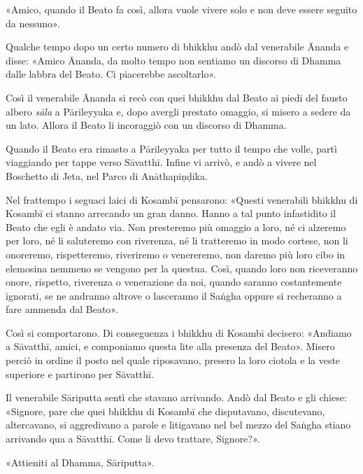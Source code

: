 «Amico, quando il Beato fa così, allora vuole vivere solo e non deve
essere seguito da nessuno».


Qualche tempo dopo un certo numero di bhikkhu andò dal venerabile Ānanda
e disse: «Amico Ānanda, da molto tempo non sentiamo un discorso di
Dhamma dalle labbra del Beato. Ci piacerebbe ascoltarlo».


Così il venerabile Ānanda si recò con quei bhikkhu dal Beato ai piedi
del fausto albero \emph{sāla} a Pārileyyaka e, dopo avergli prestato omaggio,
si misero a sedere da un lato. Allora il Beato li incoraggiò con un
discorso di Dhamma.




 Quando il Beato era rimasto a Pārileyyaka per tutto il
tempo che volle, partì viaggiando per tappe verso Sāvatthī. Infine vi
arrivò, e andò a vivere nel Boschetto di Jeta, nel Parco di
Anāthapiṇḍika.


Nel frattempo i seguaci laici di Kosambī pensarono: «Questi venerabili
bhikkhu di Kosambī ci stanno arrecando un gran danno. Hanno a tal punto
infastidito il Beato che egli è andato via. Non presteremo più omaggio a
loro, né ci alzeremo per loro, né li saluteremo con riverenza, né li
tratteremo in modo cortese, non li onoreremo, rispetteremo, riveriremo o
venereremo, non daremo più loro cibo in elemosina nemmeno se vengono per
la questua. Così, quando loro non riceveranno onore, rispetto, riverenza
o venerazione da noi, quando saranno costantemente ignorati, se ne
andranno altrove o lasceranno il Saṅgha oppure si recheranno a fare
ammenda dal Beato».


Così si comportarono. Di conseguenza i bhikkhu di Kosambī decisero:
«Andiamo a Sāvatthī, amici, e componiamo questa lite alla presenza del
Beato». Misero perciò in ordine il posto nel quale riposavano, presero
la loro ciotola e la veste superiore e partirono per Sāvatthī.


Il venerabile Sāriputta sentì che stavano arrivando. Andò dal Beato e
gli chiese: «Signore, pare che quei bhikkhu di Kosambī che disputavano,
discutevano, altercavano, si aggredivano a parole e litigavano nel bel
mezzo del Saṅgha stiano arrivando qua a Sāvatthī. Come li devo trattare,
Signore?».


«Attieniti al Dhamma, Sāriputta».


